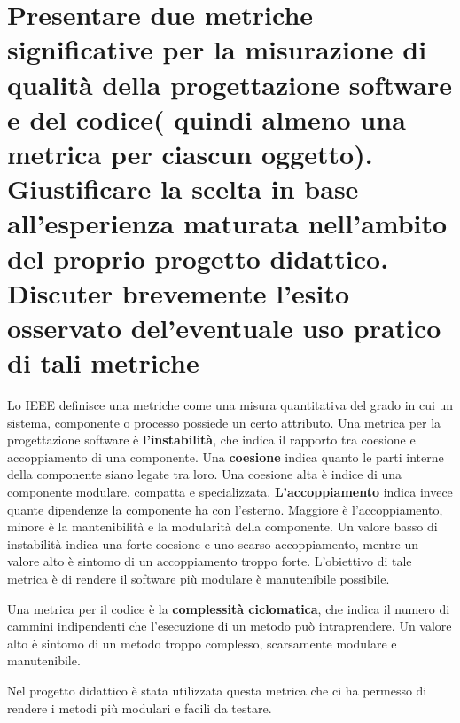 \section{Presentare due metriche significative per la misurazione di qualità della progettazione software e del codice( quindi almeno una metrica per ciascun oggetto). Giustificare la scelta in base all'esperienza maturata nell'ambito del proprio progetto didattico. Discuter brevemente l'esito osservato del'eventuale uso pratico di tali metriche}

Lo IEEE definisce una metriche come una misura quantitativa del grado in cui un sistema, componente o processo possiede un certo attributo.
Una metrica per la progettazione software è \textbf{l'instabilità}, che indica il rapporto tra coesione e accoppiamento di una componente. Una \textbf{coesione} indica quanto le parti interne della componente siano legate tra loro. Una coesione alta è indice di una componente modulare, compatta e specializzata. \textbf{L'accoppiamento} indica invece quante dipendenze la componente ha con l'esterno. Maggiore è l'accoppiamento, minore è la mantenibilità e la modularità della componente. Un valore basso di instabilità indica una forte coesione e uno scarso accoppiamento, mentre un valore alto è sintomo di un accoppiamento troppo forte. L'obiettivo di tale metrica è di rendere il software più modulare è manutenibile possibile.

Una metrica per il codice è la\textbf{ complessità ciclomatica}, che indica il numero di cammini indipendenti che l'esecuzione di un metodo può intraprendere. Un valore alto è sintomo di un metodo troppo complesso, scarsamente modulare e manutenibile. 

Nel progetto didattico è stata utilizzata questa metrica che ci ha permesso di rendere i metodi più modulari e facili da testare.
